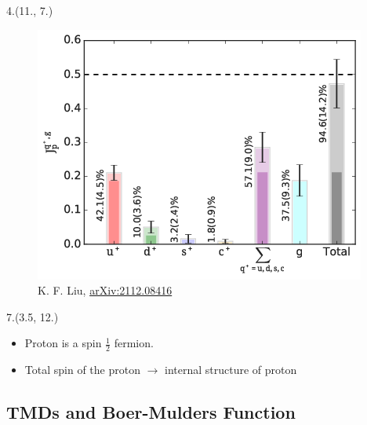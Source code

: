 \documentclass[12pt, xcolor={dvipsnames}, aspectratio = 169, sans, mathserif]{beamer}
\newenvironment{List}[2]
{\begin{textblock}{#1}#2
\begin{itemize}}
{\end{itemize}
\end{textblock}}
\newenvironment{Pic}[2]
{\begin{textblock}{#1}#2
\begin{figure}}
{\end{figure}
\end{textblock}}
\newcommand{\NewCaption}[3]{\caption{{#1}, \textcolor{blue}{\href{#2}{#3}}}}
\begin{document}
\begin{frame}
\begin{Pic}{4.}{(11., 7.)}
  \NewCaption{K. F. Liu}{https://arxiv.org/abs/2112.08416}{arXiv:2112.08416}
  \includegraphics[width=4.cm]{imgs/J_vbar_211.png}
\end{Pic}

\begin{List}{7.}{(3.5, 12.)}

  \item Proton is a spin $\frac{1}{2}$ fermion.

  \item Total spin of the proton $\rightarrow$ internal structure of proton

\end{List}

\end{frame}

\subsection{TMDs and Boer-Mulders Function}
\end{document}
